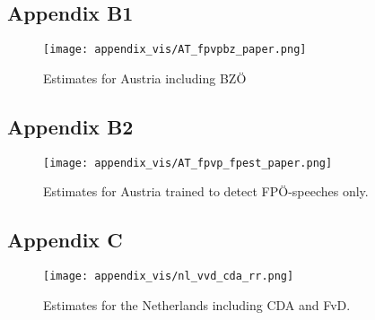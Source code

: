 \subsection*{Appendix B1}
\begin{figure}[ht!]
    \centering
    \texttt{[image: appendix\_vis/AT\_fpvpbz\_paper.png]}
    \caption{Estimates for Austria including BZÖ}
    \label{fig:bzoe}
\end{figure}

\subsection*{Appendix B2}
\begin{figure}[ht!]
    \centering
    \texttt{[image: appendix\_vis/AT\_fpvp\_fpest\_paper.png]}
    \caption{Estimates for Austria trained to detect FPÖ-speeches only.}
    \label{fig:fponly}
\end{figure}
\newpage

\subsection*{Appendix C}
\begin{figure}[ht!]
    \centering
    \texttt{[image: appendix\_vis/nl\_vvd\_cda\_rr.png]}
    \caption{Estimates for the Netherlands including CDA and FvD.}
    \label{fig:cda}
\end{figure}

